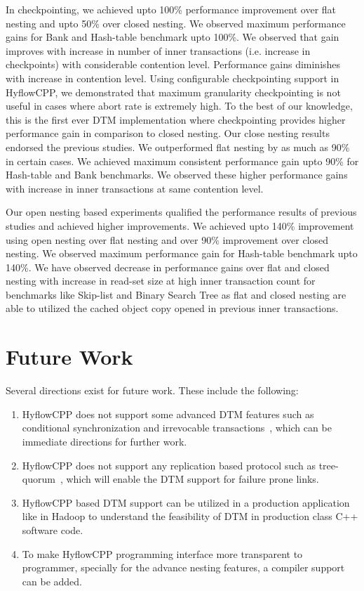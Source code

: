 \documentclass[12pt,english]{report}
\begin{document}
In checkpointing, we achieved upto 100\% performance improvement over flat nesting and upto 50\% over closed nesting. We observed maximum performance gains for Bank and Hash-table benchmark upto 100\%. We observed that gain improves with increase in number of inner transactions (i.e. increase in checkpoints) with considerable contention level. Performance gains diminishes with increase in contention level. Using configurable checkpointing support in HyflowCPP, we demonstrated that maximum granularity checkpointing is not useful in cases where abort rate is extremely high. To the best of our knowledge, this is the first ever DTM implementation where checkpointing provides higher performance gain in comparison to closed nesting. Our close nesting results endorsed the previous studies. We outperformed flat nesting by as much as 90\% in certain cases. We achieved maximum consistent performance gain upto 90\% for Hash-table and Bank benchmarks. We observed these higher performance gains with increase in inner transactions at same contention level.

Our open nesting based experiments qualified the performance results of previous studies and achieved higher improvements. We achieved upto 140\% improvement using open nesting over flat nesting and over 90\% improvement over closed nesting. We observed maximum performance gain for Hash-table benchmark upto 140\%. %
We have observed decrease in performance gains over flat and closed nesting with increase in read-set size at high inner transaction count for benchmarks like Skip-list and Binary Search Tree as flat and closed nesting are able to utilized the cached object copy opened in previous inner transactions. 

\section{Future Work}

Several directions exist for future work. These include the following:

\begin{enumerate}
\item HyflowCPP does not support some advanced DTM features such as conditional synchronization and 
irrevocable transactions~\cite{welc2008irrevocable}, which can be immediate directions for further work.
\item HyflowCPP does not support any replication based protocol such as tree-quorum~\cite{Zhang:2011:QRF:2183536.2183539}, which will enable the DTM support for failure prone links.
\item HyflowCPP based DTM support can be utilized in a production application like in Hadoop to understand the feasibility of DTM in production class C++ software code.
\item To make HyflowCPP programming interface more transparent to programmer, specially for the advance nesting features, a compiler support can be added. 
\end{enumerate}

\newpage
{}



\end{document}
